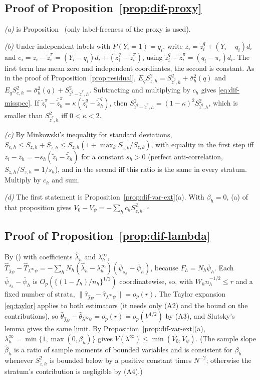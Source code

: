 \subsection{Proof of Proposition~\ref{prop:dif-proxy}}

\emph{(a)} is Proposition~ (only label-freeness of the proxy is used).

\emph{(b)} Under independent labels with $P(Y_i=1)=q_i$, write $z_i=\tilde z^q_i+(Y_i-q_i)d_i$ and $e_i=z_i-\tilde z^\pi_i=(Y_i-q_i)d_i+(\tilde z^q_i-\tilde z^\pi_i)$, using $\tilde z^q_i-\tilde z^\pi_i=(q_i-\pi_i)d_i$. The first term has mean zero and independent coordinates, the second is constant. As in the proof of
Proposition~\ref{prop:residual}, $E_qS^2_{z,h}=S^2_{\tilde z^q,h}+\bar\sigma^2_h(q)$ and $E_qS^2_{e,h}=\bar\sigma^2_h(q)+S^2_{\tilde z^q-\tilde z^\pi,h}$. Subtracting and multiplying by $c_h$ gives \eqref{eq:dif-misspec}.
If $\tilde z^\pi_i-\bar{\tilde z}^\pi_h=\kappa(\tilde z^q_i-\bar{\tilde z}^q_h)$, then $S^2_{\tilde z^q-\tilde z^\pi,h}=(1-\kappa)^2S^2_{\tilde z^q,h}$, which is smaller than $S^2_{\tilde z^q,h}$ iff $0<\kappa<2$.

\emph{(c)} By Minkowski's inequality for standard deviations, $S_{e,h}\le S_{z,h}+S_{\tilde z,h}\le S_{z,h}(1+\max_kS_{\tilde z,k}/S_{z,k})$, with equality in the first step iff $z_i-\bar z_h=-s_h(\tilde z_i-\bar{\tilde z}_h)$ for a constant $s_h>0$ (perfect anti-correlation, $S_{\tilde z,h}/S_{z,h}=1/s_h$), and in the second iff this ratio is the same in every stratum. Multiply by $c_h$ and sum.

\emph{(d)} The first statement is Proposition~\ref{prop:dif-var-ext}(a). With $\beta_h=0$, (a) of that proposition gives $V_0-V_\psi=-\sum_hc_hS^2_{\tilde z,h}$. $\square$

\subsection{Proof of Proposition~\ref{prop:dif-lambda}}

By () with coefficients $\hat\lambda_h$ and $\lambda_h^\infty$, $\hat T_{\hat\lambda\psi}-\hat T_{\lambda^\infty\psi}=-\sum_hN_h(\hat\lambda_h-\lambda^\infty_h)(\bar\psi_{s_h}-\bar\psi_h)$, because $F_h=N_h\bar\psi_h$.
Each $\bar\psi_{s_h}-\bar\psi_h$ is $O_p(\{(1-f_h)/n_h\}^{1/2})$ coordinatewise, so, with $W_hn_h^{-1/2}\le r$ and a fixed number of strata,
$\|\hat\tau_{\hat\lambda\psi}-\hat\tau_{\lambda^\infty\psi}\|=o_p(r)$. The Taylor expansion \eqref{eq:taylor} applies to both estimators (it needs only (A2) and the bound on the contributions), so
$\hat\theta_{\hat\lambda\psi}-\hat\theta_{\lambda^\infty\psi}=o_p(r)=o_p(V^{1/2})$ by (A3), and Slutsky's lemma gives the same limit. By Proposition~\ref{prop:dif-var-ext}(a), $\lambda^\infty_h=\min\{1,\max(0,\beta_h)\}$ gives
$V(\lambda^\infty)\le\min(V_0,V_\psi)$. (The sample slope $\hat\beta_h$ is a ratio of sample moments of bounded variables and is consistent for $\beta_h$ whenever $S^2_{\tilde z,h}$ is bounded below by a positive constant
times $N^{-2}$; otherwise the stratum's contribution is negligible by (A4).)

